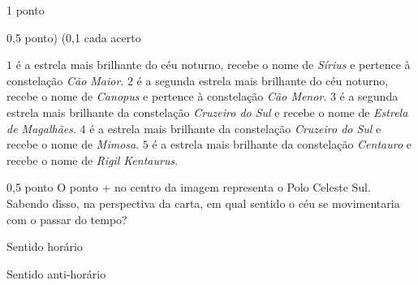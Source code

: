 \documentclass{../lista}
\begin{document}
\begin{questao}{1 ponto}
\begin{pergunta}{0,5 ponto) (0,1 cada acerto}
			\begin{alternativas}
				\alternativaMarcada[$\red{C}$] $1$ é a estrela mais brilhante do céu noturno, recebe o nome de \textit{Sírius} e pertence à constelação \textit{Cão Maior}.
				\alternativaMarcada[$\red{E}$] $2$ é a segunda estrela mais brilhante do céu noturno, recebe o nome de \textit{Canopus} e pertence à constelação \textit{Cão Menor}.
				\alternativaMarcada[$\red{E}$] $3$ é a segunda estrela mais brilhante da constelação \textit{Cruzeiro do Sul} e recebe o nome de \textit{Estrela de Magalhães}.
				\alternativaMarcada[$\red{E}$] $4$ é a estrela mais brilhante da constelação \textit{Cruzeiro do Sul} e recebe o nome de \textit{Mimosa}.
				\alternativaMarcada[$\red{C}$] $5$ é a estrela mais brilhante da constelação \textit{Centauro} e recebe o nome de \textit{Rigil Kentaurus}.
			\end{alternativas}
		\end{pergunta}

		\begin{pergunta}{0,5 ponto}
			O ponto $+$ no centro da imagem representa o Polo Celeste Sul. Sabendo disso, na perspectiva da carta, em qual sentido o céu se movimentaria com o passar do tempo?
			\begin{multicols}{2} \begin{alternativas}
				\alternativaMarcada Sentido horário
				\item Sentido anti-horário
			\end{alternativas} \end{multicols}
		\end{pergunta}
	\end{questao}
\end{document}
